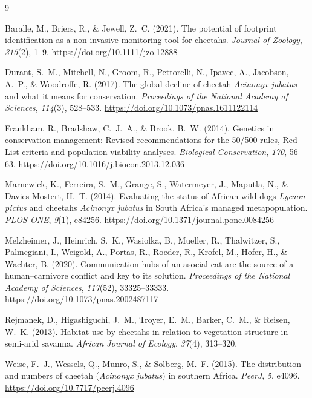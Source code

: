 \documentclass[12pt, letterpaper]{article}
\begin{document}
\newpage

\begin{thebibliography}{9}
\setlength{\itemsep}{6pt}

Baralle, M., Briers, R., \& Jewell, Z.\ C. (2021). The potential of footprint identification as a
non-invasive monitoring tool for cheetahs. \textit{Journal of Zoology}, \textit{315}(2), 1--9.
\url{https://doi.org/10.1111/jzo.12888}

Durant, S.\ M., Mitchell, N., Groom, R., Pettorelli, N., Ipavec, A., Jacobson, A.\ P., \&
Woodroffe, R. (2017). The global decline of cheetah \textit{Acinonyx jubatus} and what it
means for conservation. \textit{Proceedings of the National Academy of Sciences},
\textit{114}(3), 528--533. \url{https://doi.org/10.1073/pnas.1611122114}

Frankham, R., Bradshaw, C.\ J.\ A., \& Brook, B.\ W. (2014). Genetics in conservation
management: Revised recommendations for the 50/500 rules, Red List criteria and population
viability analyses. \textit{Biological Conservation}, \textit{170}, 56--63.
\url{https://doi.org/10.1016/j.biocon.2013.12.036}

Marnewick, K., Ferreira, S.\ M., Grange, S., Watermeyer, J., Maputla, N., \&
Davies-Mostert, H.\ T. (2014). Evaluating the status of African wild dogs \textit{Lycaon
pictus} and cheetahs \textit{Acinonyx jubatus} in South Africa's managed metapopulation.
\textit{PLOS ONE}, \textit{9}(1), e84256.
\url{https://doi.org/10.1371/journal.pone.0084256}

Melzheimer, J., Heinrich, S.\ K., Wasiolka, B., Mueller, R., Thalwitzer, S., Palmegiani, I.,
Weigold, A., Portas, R., Roeder, R., Krofel, M., Hofer, H., \& Wachter, B. (2020).
Communication hubs of an asocial cat are the source of a human--carnivore conflict and key to
its solution. \textit{Proceedings of the National Academy of Sciences}, \textit{117}(52),
33325--33333. \url{https://doi.org/10.1073/pnas.2002487117}

Rejmanek, D., Higashiguchi, J.\ M., Troyer, E.\ M., Barker, C.\ M., \& Reisen, W.\ K.
(2013). Habitat use by cheetahs in relation to vegetation structure in semi-arid savanna.
\textit{African Journal of Ecology}, \textit{37}(4), 313--320.

Weise, F.\ J., Wessels, Q., Munro, S., \& Solberg, M.\ F. (2015). The distribution and numbers
of cheetah (\textit{Acinonyx jubatus}) in southern Africa. \textit{PeerJ}, \textit{5}, e4096.
\url{https://doi.org/10.7717/peerj.4096}

\end{thebibliography}
\end{document}
